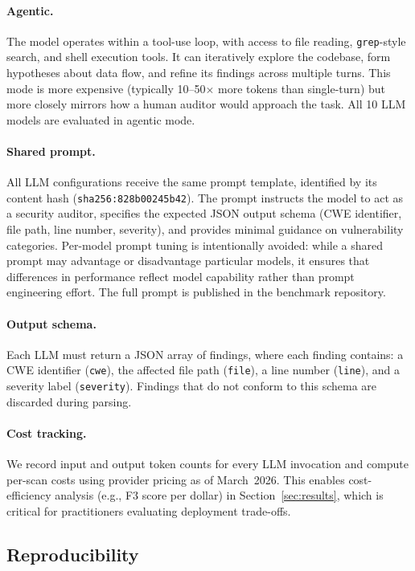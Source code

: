 \paragraph{Agentic.}
The model operates within a tool-use loop, with access to file reading,
\texttt{grep}-style search, and shell execution tools. It can
iteratively explore the codebase, form hypotheses about data flow, and
refine its findings across multiple turns. This mode is more expensive
(typically 10--50$\times$ more tokens than single-turn) but more
closely mirrors how a human auditor would approach the task. All 10
LLM models are evaluated in agentic mode.

\paragraph{Shared prompt.}
All LLM configurations receive the same prompt template, identified by
its content hash (\texttt{sha256:828b00245b42}). The prompt instructs
the model to act as a security auditor, specifies the expected JSON
output schema (CWE identifier, file path, line number, severity), and
provides minimal guidance on vulnerability categories. Per-model prompt
tuning is intentionally avoided: while a shared prompt may
advantage or disadvantage particular models, it ensures that differences
in performance reflect model capability rather than prompt engineering
effort. The full prompt is published in the benchmark repository.

\paragraph{Output schema.}
Each LLM must return a JSON array of findings, where each finding
contains: a CWE identifier (\texttt{cwe}), the affected file path
(\texttt{file}), a line number (\texttt{line}), and a severity label
(\texttt{severity}). Findings that do not conform to this schema are
discarded during parsing.

\paragraph{Cost tracking.}
We record input and output token counts for every LLM invocation and
compute per-scan costs using provider pricing as of March~2026. This
enables cost-efficiency analysis (e.g., F3 score per dollar) in
Section~\ref{sec:results}, which is critical for practitioners
evaluating deployment trade-offs.

\subsection{Reproducibility}
\label{sec:reproducibility}

